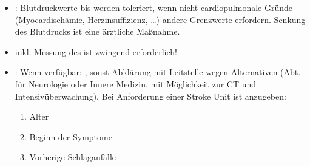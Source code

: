 \begin{itemize}
\begin{itemize}
\begin{enumerate}
      eines Notarztes erforderlich machen.
      \item Es muss versucht werden, eine Aufnahme auf eine
       für Schlaganfälle zu
      organisieren\footnote{Der Erfolg ist abhängig von der
      Verfügbarkeit eines entsprechenden freien Bettes.} (Stroke Unit,
      Kontaktaufnahme mit der Leitstelle).
      \item Regionale Bestimmungen müssen beachtet werden!
    \end{enumerate}
  \end{itemize}
  \item  {}: Blutdruckwerte bis  werden toleriert,
  wenn nicht cardiopulmonale Gründe (Myocardischämie,
  Herzinsuffizienz, \ldots) andere Grenzwerte erfordern.
  Senkung des Blutdrucks ist eine ärztliche Maßnahme.
  \item {} inkl. Messung des  ist
  zwingend erforderlich!
  \item {}: Wenn verfügbar: , sonst
  Abklärung mit Leitstelle wegen Alternativen (Abt. für
  Neurologie oder Innere Medizin, mit Möglichkeit zur CT und
  Intensivüberwachung).
  Bei Anforderung einer Stroke Unit ist anzugeben:
  \begin{enumerate}
    \item Alter
    \item Beginn der Symptome
    \item Vorherige Schlaganfälle
  \end{enumerate}
\end{itemize}



\cite{Aass-1.0var1,AassMk-2013var1,MA70-Protokoll-2012-10-11,AsboeLvWien-2013-01-29,Lang2012,Ma70-Ausrueckordnung-2012-01-24}
